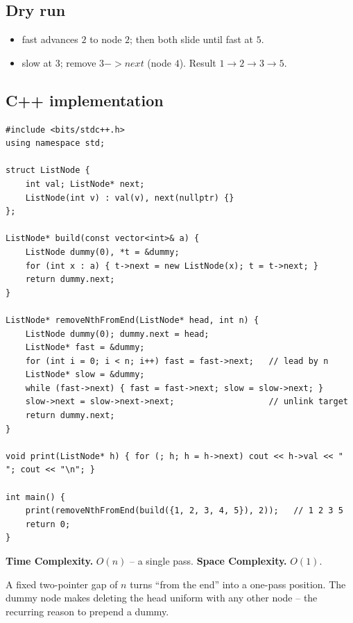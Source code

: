 \subsection*{Dry run}


\begin{itemize}
  \item fast advances $2$ to node $2$; then both slide until fast at $5$.
  \item slow at $3$; remove $3->next$ (node $4$). Result $1\to2\to3\to5$.
\end{itemize}

\subsection*{C++ implementation}

\begin{lstlisting}
#include <bits/stdc++.h>
using namespace std;

struct ListNode {
    int val; ListNode* next;
    ListNode(int v) : val(v), next(nullptr) {}
};

ListNode* build(const vector<int>& a) {
    ListNode dummy(0), *t = &dummy;
    for (int x : a) { t->next = new ListNode(x); t = t->next; }
    return dummy.next;
}

ListNode* removeNthFromEnd(ListNode* head, int n) {
    ListNode dummy(0); dummy.next = head;
    ListNode* fast = &dummy;
    for (int i = 0; i < n; i++) fast = fast->next;   // lead by n
    ListNode* slow = &dummy;
    while (fast->next) { fast = fast->next; slow = slow->next; }
    slow->next = slow->next->next;                   // unlink target
    return dummy.next;
}

void print(ListNode* h) { for (; h; h = h->next) cout << h->val << " "; cout << "\n"; }

int main() {
    print(removeNthFromEnd(build({1, 2, 3, 4, 5}), 2));   // 1 2 3 5
    return 0;
}
\end{lstlisting}

\begin{complexitybox}
\textbf{Time Complexity.} $O(n)$ -- a single pass. \textbf{Space
Complexity.} $O(1)$.
\end{complexitybox}

\begin{takeawaybox}
A fixed two-pointer gap of $n$ turns ``from the end'' into a one-pass
position. The dummy node makes deleting the head uniform with any other
node -- the recurring reason to prepend a dummy.
\end{takeawaybox}
